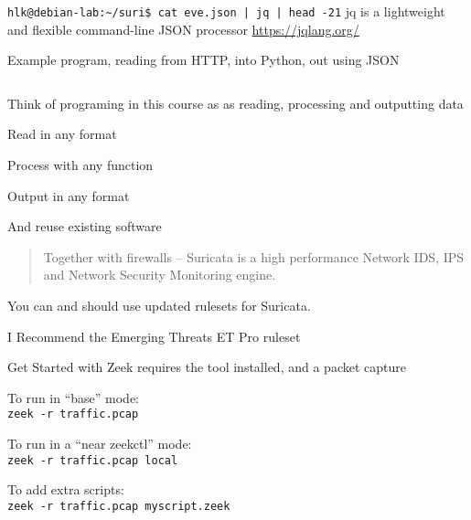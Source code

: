 \documentclass[Screen16to9,17pt]{foils}
\begin{document}
\begin{list2}
\item
\verb+hlk@debian-lab:~/suri$ cat eve.json | jq | head -21+
jq is a lightweight and flexible command-line JSON processor \url{https://jqlang.org/}
\end{list2}





Example program, reading from HTTP, into Python, out using JSON
\inputminted{python}{programs/rest-1.py}

\begin{list2}
\item Think of programing in this course as as reading, processing and outputting data
\item Read in any format
\item Process with any function
\item Output in any format
\item And reuse existing software
\end{list2}





\begin{quote}
Together with firewalls -- Suricata is a high performance Network IDS, IPS and Network Security Monitoring engine.
\end{quote}






You can and should use updated rulesets for Suricata.

I Recommend the Emerging Threats ET Pro ruleset





Get Started with Zeek requires the tool installed, and a packet capture

\begin{list2}
\item To run in “base” mode:\\
 \verb+zeek -r traffic.pcap+
\item To run in a “near zeekctl” mode:\\
\verb+zeek -r traffic.pcap local+
\item To add extra scripts:\\
\verb+zeek -r traffic.pcap myscript.zeek+
\end{list2}
\end{document}
